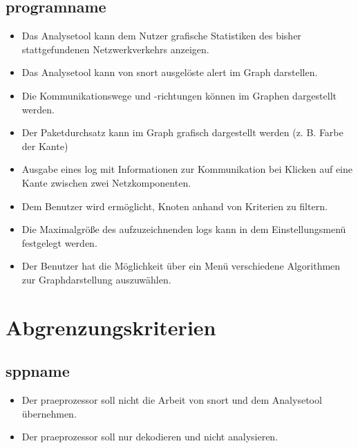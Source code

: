 \subsection{\gls{programname}}

\begin{itemize}
\item Das Analysetool kann dem Nutzer grafische Statistiken des bisher stattgefundenen Netzwerkverkehrs anzeigen.

\item Das Analysetool kann von \gls{snort} ausgelöste \gls{alert} im Graph darstellen.

\item Die Kommunikationswege und -richtungen können im Graphen dargestellt werden.

\item Der Paketdurchsatz kann im Graph grafisch dargestellt werden (z. B. Farbe der Kante)

\item Ausgabe eines \gls{log} mit Informationen zur Kommunikation bei Klicken auf eine Kante zwischen zwei Netzkomponenten.

\item Dem Benutzer wird ermöglicht, Knoten anhand von Kriterien zu filtern.

\item Die Maximalgröße des aufzuzeichnenden \glspl{log} kann in dem Einstellungsmenü festgelegt werden.

\item Der Benutzer hat die Möglichkeit über ein Menü verschiedene Algorithmen zur Graphdarstellung auszuwählen.
\end{itemize}

\section{Abgrenzungskriterien}

\subsection{\gls{sppname}}
\begin{itemize}
\item Der \gls{praeprozessor} soll nicht die Arbeit von \gls{snort} und dem Analysetool übernehmen.

\item Der \gls{praeprozessor} soll nur dekodieren und nicht analysieren.

\end{itemize}

